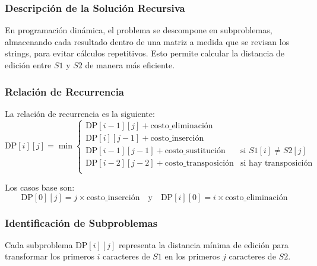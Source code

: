 \subsubsection{Descripción de la Solución Recursiva}
En programación dinámica, el problema se descompone en subproblemas, almacenando cada resultado dentro de una matriz a medida que se revisan los strings, para evitar cálculos repetitivos. Esto permite calcular la distancia de edición entre \( S1 \) y \( S2 \) de manera más eficiente.


\subsubsection{Relación de Recurrencia}
La relación de recurrencia es la siguiente:
\[
\text{DP}[i][j] = \min \begin{cases} 
    \text{DP}[i-1][j] + \text{costo\_eliminación} \\
    \text{DP}[i][j-1] + \text{costo\_inserción} \\
    \text{DP}[i-1][j-1] + \text{costo\_sustitución} & \text{si } S1[i] \neq S2[j] \\
    \text{DP}[i-2][j-2] + \text{costo\_transposición} & \text{si hay transposición} \\
\end{cases}
\]

Los casos base son:
\[
\text{DP}[0][j] = j \times \text{costo\_inserción} \quad \text{y} \quad \text{DP}[i][0] = i \times \text{costo\_eliminación}
\]

\subsubsection{Identificación de Subproblemas}
Cada subproblema \( \text{DP}[i][j] \) representa la distancia mínima de edición para transformar los primeros \( i \) caracteres de \( S1 \) en los primeros \( j \) caracteres de \( S2 \).



